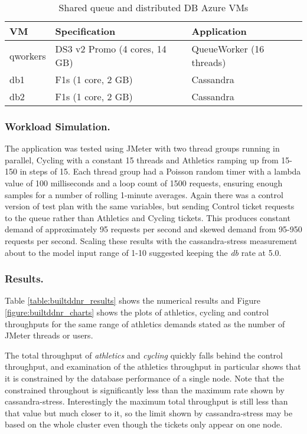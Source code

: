 \begin{table}[h!]
	\begin{center}
		\caption{Shared queue and distributed DB Azure VMs}
		\label{table:builtddnr_vmdesign}
		\begin{tabular}{l | l | l}
			VM		& Specification			& Application \\
			\hline
			qworkers	& DS3 v2 Promo (4 cores, 14 GB)	& QueueWorker (16 threads) \\
			db1		& F1s (1 core, 2 GB)		& Cassandra \\
			db2		& F1s (1 core, 2 GB)		& Cassandra \\
		\end{tabular}
	\end{center}
\end{table}

\subsubsection{Workload Simulation.}  The application was tested using JMeter with two thread groups running in parallel, Cycling with a constant 15 threads and Athletics ramping up from 15-150 in steps of 15.  Each thread group had a Poisson random timer with a lambda value of 100 milliseconds and a loop count of 1500 requests, ensuring enough samples for a number of rolling 1-minute averages.  Again there was a control version of test plan with the same variables, but sending Control ticket requests to the queue rather than Athletics and Cycling tickets.  This produces constant demand of approximately 95 requests per second and skewed demand from 95-950 requests per second.  Scaling these results with the cassandra-stress measurement about to the model input range of 1-10 suggested keeping the {\itshape db} rate at 5.0.

\subsubsection{Results.} 
Table \ref{table:builtddnr_results} shows the numerical results and Figure \ref{figure:builtddnr_charts} shows the plots of athletics, cycling and control throughputs for the same range of athletics demands stated as the number of JMeter threads or users.

The total throughput of {\itshape athletics} and {\itshape cycling} quickly falls behind the control throughput, and examination of the athletics throughput in particular shows that it is constrained by the database performance of a single node.  Note that the constrained throughout is significantly less than the maximum rate shown by cassandra-stress.  Interestingly the maximum total throughput is still less than that value but much closer to it, so the limit shown by cassandra-stress may be based on the whole cluster even though the tickets only appear on one node.

